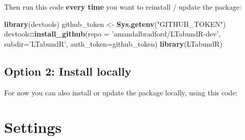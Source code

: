 \documentclass[
]{book}
\newenvironment{Shaded}{\begin{snugshade}}{\end{snugshade}}
\newcommand{\CommentTok}[1]{\textcolor[rgb]{0.56,0.35,0.01}{\textit{#1}}}
\newcommand{\ControlFlowTok}[1]{\textcolor[rgb]{0.13,0.29,0.53}{\textbf{#1}}}
\newcommand{\DataTypeTok}[1]{\textcolor[rgb]{0.13,0.29,0.53}{#1}}
\newcommand{\KeywordTok}[1]{\textcolor[rgb]{0.13,0.29,0.53}{\textbf{#1}}}
\newcommand{\NormalTok}[1]{#1}
\newcommand{\OperatorTok}[1]{\textcolor[rgb]{0.81,0.36,0.00}{\textbf{#1}}}
\newcommand{\StringTok}[1]{\textcolor[rgb]{0.31,0.60,0.02}{#1}}
\begin{document}
Then run this code \textbf{every time} you want to reinstall / update the package:

\begin{Shaded}
\begin{Highlighting}[]
\KeywordTok{library}\NormalTok{(devtools)}
\NormalTok{github_token <-}\StringTok{ }\KeywordTok{Sys.getenv}\NormalTok{(}\StringTok{"GITHUB_TOKEN"}\NormalTok{)}
\NormalTok{devtools}\OperatorTok{::}\KeywordTok{install_github}\NormalTok{(}\DataTypeTok{repo =} \StringTok{'amandalbradford/LTabundR-dev'}\NormalTok{,}
                         \DataTypeTok{subdir=}\StringTok{'LTabundR'}\NormalTok{,}
                         \DataTypeTok{auth_token=}\NormalTok{github_token)}
\KeywordTok{library}\NormalTok{(LTabundR)}
\end{Highlighting}
\end{Shaded}

\hypertarget{option-2-install-locally}{%
\section*{Option 2: Install locally}\label{option-2-install-locally}}

For now you can also install or update the package locally, using this code:

\begin{Shaded}
\end{Shaded}

\hypertarget{settings}{%
\chapter{Settings}\label{settings}}
\end{document}

